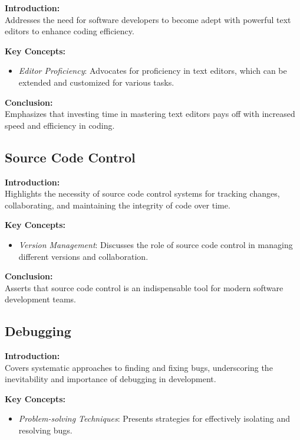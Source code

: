 \textbf{Introduction:} \\
Addresses the need for software developers to become adept with powerful text editors to enhance coding efficiency.

\vspace{2mm}
\noindent\textbf{Key Concepts:}
\begin{itemize}
  \item \textit{Editor Proficiency}: Advocates for proficiency in text editors, which can be extended and customized for various tasks.
\end{itemize}

\vspace{2mm}
\noindent\textbf{Conclusion:} \\
Emphasizes that investing time in mastering text editors pays off with increased speed and efficiency in coding.

\subsection{Source Code Control}

\textbf{Introduction:} \\
Highlights the necessity of source code control systems for tracking changes, collaborating, and maintaining the integrity of code over time.

\vspace{2mm}
\noindent\textbf{Key Concepts:}
\begin{itemize}
  \item \textit{Version Management}: Discusses the role of source code control in managing different versions and collaboration.
\end{itemize}

\vspace{2mm}
\noindent\textbf{Conclusion:} \\
Asserts that source code control is an indispensable tool for modern software development teams.

\subsection{Debugging}

\textbf{Introduction:} \\
Covers systematic approaches to finding and fixing bugs, underscoring the inevitability and importance of debugging in development.

\vspace{2mm}
\noindent\textbf{Key Concepts:}
\begin{itemize}
  \item \textit{Problem-solving Techniques}: Presents strategies for effectively isolating and resolving bugs.
\end{itemize}

